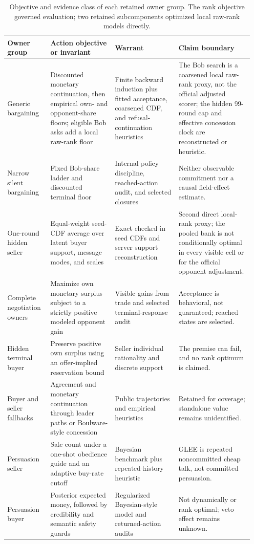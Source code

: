 \begin{table}[h]
\centering
\small
\caption{Objective and evidence class of each retained owner group. The rank
objective governed evaluation; two retained subcomponents optimized local
raw-rank models directly.}
\label{tab:owner_objectives}
\begin{tabularx}{\linewidth}{@{}p{3.0cm}p{3.8cm}p{4.0cm}Y@{}}
\toprule
Owner group & Action objective or invariant & Warrant & Claim boundary \\
\midrule
Generic bargaining & Discounted monetary continuation, then empirical own- and opponent-share floors; eligible Bob asks add a local raw-rank floor & Finite backward induction plus fitted acceptance, coarsened CDF, and refusal-continuation heuristics & The Bob search is a coarsened local raw-rank proxy, not the official adjusted scorer; the hidden 99-round cap and effective concession clock are reconstructed or heuristic. \\
Narrow silent bargaining & Fixed Bob-share ladder and discounted terminal floor & Internal policy discipline, reached-action audit, and selected closures & Neither observable commitment nor a causal field-effect estimate. \\
One-round hidden seller & Equal-weight seed-CDF average over latent buyer support, message modes, and scales & Exact checked-in seed CDFs and server support reconstruction & Second direct local-rank proxy; the pooled bank is not conditionally optimal in every visible cell or for the official opponent adjustment. \\
Complete negotiation owners & Maximize own monetary surplus subject to a strictly positive modeled opponent gain & Visible gains from trade and selected terminal-response audit & Acceptance is behavioral, not guaranteed; reached states are selected. \\
Hidden terminal buyer & Preserve positive own surplus using an offer-implied reservation bound & Seller individual rationality and discrete support & The premise can fail, and no rank optimum is claimed. \\
Buyer and seller fallbacks & Agreement and monetary continuation through leader paths or Boulware-style concession & Public trajectories and empirical heuristics & Retained for coverage; standalone value remains unidentified. \\
Persuasion seller & Sale count under a one-shot obedience guide and an adaptive buy-rate cutoff & Bayesian benchmark plus repeated-history heuristic & GLEE is repeated noncommitted cheap talk, not committed persuasion. \\
Persuasion buyer & Posterior expected money, followed by credibility and semantic safety guards & Regularized Bayesian-style model and returned-action audits & Not dynamically or rank optimal; veto effect remains unknown. \\
\bottomrule
\end{tabularx}
\end{table}

